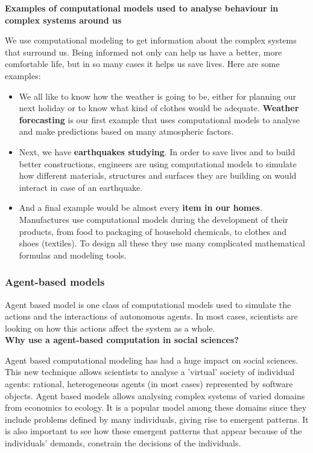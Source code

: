 \documentclass[../main.tex]{subfiles}
\begin{document}
\textbf{Examples of computational models used to analyse behaviour in complex systems around us}

We use computational modeling to get information about the complex systems that surround us. Being informed not only can help us have a better, more comfortable life, but in so many cases it helps us save lives. Here are some examples:
\begin{itemize}
    \item We all like to know how the weather is going to be, either for planning our next holiday or to know what kind of clothes would be adequate. \textbf{Weather forecasting} is our first example that uses computational models to analyse and make predictions based on many atmospheric factors.\\
    
    \item Next, we have \textbf{earthquakes studying}. In order to save lives and to build better constructions, engineers are using computational models to simulate how different materials, structures and surfaces they are building on would interact in case of an earthquake.\\
    
    \item And a final example would be almost every \textbf{item in our homes}. Manufactures use computational models during the development of their products, from food to packaging of household chemicals, to clothes and shoes (textiles). To design all these they use many complicated mathematical formulas and modeling tools.
\end{itemize}


\subsubsection{Agent-based models}
Agent based model is one class of computational models used to simulate the actions and the interactions of autonomous agents. In most cases, scientists are looking on how this actions affect the system as a whole. \\


\textbf{Why use a agent-based computation in social sciences?}

Agent based computational modeling has had a huge impact on social sciences. This new technique allows scientists to analyse a 'virtual' society of individual agents: rational, heterogeneous agents (in most cases) represented by software objects. Agent based models allows analysing complex systems of varied domains from economics to ecology. It is a popular model among these domains since they include problems defined by many individuals, giving rise to emergent patterns. It is also important to see how these emergent patterns that appear because of the individuals' demands, constrain the decisions of the individuals.\\  
\end{document}
